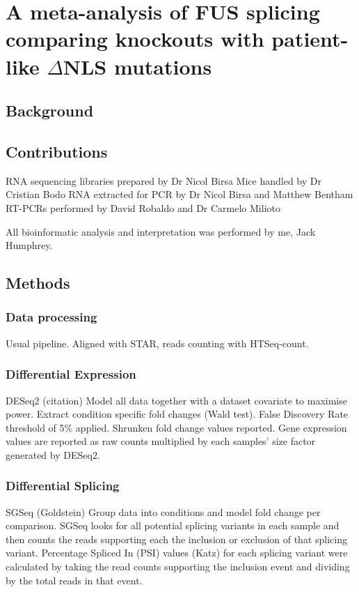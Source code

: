 \chapter{A meta-analysis of FUS splicing comparing knockouts with patient-like $\Delta$NLS mutations}
\label{chapter:fus_meta}

\section{Background}


\section{Contributions}
RNA sequencing libraries prepared by Dr Nicol Birsa
Mice handled by Dr Cristian Bodo
RNA extracted for PCR by Dr Nicol Birsa and Matthew Bentham
RT-PCRs performed by David Robaldo and Dr Carmelo Milioto

All bioinformatic analysis and interpretation was performed by me, Jack Humphrey.

\section{Methods}

\subsection{Data processing}
Usual pipeline. Aligned with STAR, reads counting with HTSeq-count. 

\subsection{Differential Expression}
DESeq2 (citation)
Model all data together with a dataset covariate to maximise power.
Extract condition specific fold changes (Wald test). False Discovery Rate threshold of 5\% applied. Shrunken fold change values reported. Gene expression values are reported as raw counts multiplied by each samples’ size factor generated by DESeq2.

\subsection{Differential Splicing}
SGSeq (Goldstein)
Group data into conditions and model fold change per comparison. SGSeq looks for all potential splicing variants in each sample and then counts the reads supporting each the inclusion or exclusion of that splicing variant. 
Percentage Spliced In (PSI) values (Katz) for each splicing variant were calculated by taking the read counts supporting the inclusion event and dividing by the total reads in that event. 

